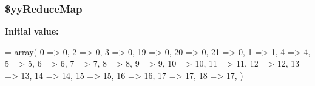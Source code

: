 \subsubsection[{\$yy\+Reduce\+Map}]{\setlength{\rightskip}{0pt plus 5cm}\$yy\+Reduce\+Map\hspace{0.3cm}{\ttfamily [static]}}\label{class_smarty___internal___configfileparser_a17cfef4cb3aee573c01e8df05085eaf9}
{\bfseries Initial value\+:}
\begin{DoxyCode}
= array(
        0 => 0,
        2 => 0,
        3 => 0,
        19 => 0,
        20 => 0,
        21 => 0,
        1 => 1,
        4 => 4,
        5 => 5,
        6 => 6,
        7 => 7,
        8 => 8,
        9 => 9,
        10 => 10,
        11 => 11,
        12 => 12,
        13 => 13,
        14 => 14,
        15 => 15,
        16 => 16,
        17 => 17,
        18 => 17,
    )
\end{DoxyCode}
\hypertarget{class_smarty___internal___configfileparser_a1b2c73431788fbe1e01f52637b23b32d}{}
